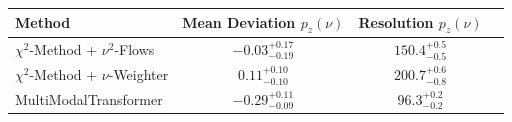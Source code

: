     \begin{tabular}{lccc}
        \toprule
        Method & Mean Deviation $p_{z}(\nu)$ & Resolution $p_{z}(\nu)$ \\
        \midrule
        $\chi^2$-Method + $\nu^2$-Flows & $-0.03^{+0.17}_{-0.19}$ & $150.4^{+0.5}_{-0.5}$ \\
        $\chi^2$-Method + $\nu$-Weighter & $0.11^{+0.10}_{-0.10}$ & $200.7^{+0.6}_{-0.8}$ \\
        MultiModalTransformer & $-0.29^{+0.11}_{-0.09}$ & $96.3^{+0.2}_{-0.2}$ \\
        \bottomrule
    \end{tabular}